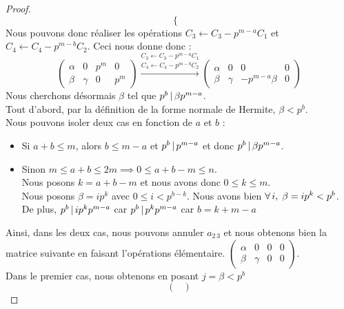 \documentclass[12pt]{article}
\begin{document}
\begin{proof}
$$\begin{cases*}
		\end{cases*}$$
	Nous pouvons donc réaliser les opérations $C_3 \leftarrow C_3 -p^{m-a}C_1$ et
	$C_4 \leftarrow C_4 -p^{m-b}C_2$. Ceci nous donne donc :
	\begin{equation*}
		\begin{pmatrix}
			\alpha & 0      & p^m & 0   \\
			\beta  & \gamma & 0   & p^m
		\end{pmatrix}
		\overset{C_3 \leftarrow C_3 -p^{m-a}C_1 }%
		{\overset{ C_4 \leftarrow C_4 -p^{m-b}C_2}{\longrightarrow}}
		\begin{pmatrix}
			\alpha & 0      & 0             & 0 \\
			\beta  & \gamma & -p^{m-a}\beta & 0
		\end{pmatrix}
	\end{equation*}
	Nous cherchons désormais $\beta$ tel que $p^b \, | \, \beta p^{m-a}$.\\
	Tout d'abord, par la définition de la forme normale de Hermite, $\beta< p^b$.\\
	Nous pouvons isoler deux cas en fonction de $a$ et $b$ :\\
	\begin{itemize}
		\item Si $a + b \le m$, alors $b \le m - a$ et $p^b \, | \, p^{m-a}$ et
		      donc $p^b \, | \, \beta p^{m-a}$.\\
		\item Sinon $m \le a + b \le 2m \implies 0 \le a + b -m \le n$.\\
		      Nous posons $k = a + b -m$ et nous avons donc $0 \le k \le m$.\\
		      Nous posons $\beta = ip^k$ avec $0 \le i < p^{b - k}$. Nous avons bien
		      $\forall \, i , \; \beta = ip^k < p^b$.\\
		      De plus, $p^b \, | \, ip^kp^{m-a}$ car  $p^b \, | \, p^kp^{m-a}$
		      car  $b = k + m - a$
	\end{itemize}
	Ainsi, dans les deux cas, nous pouvons annuler $a_{2\,3}$ et nous obtenons bien la matrice
	suivante en faisant l'opérations élémentaire.
	$\begin{pmatrix}
			\alpha & 0      & 0 & 0 \\
			\beta  & \gamma & 0 & 0
		\end{pmatrix}$.\\
	Dans le premier cas, nous obtenons en posant $j = \beta < p^b$
	\begin{equation*}
		\begin{pmatrix}

\end{pmatrix}
\end{equation*}
\end{proof}
\end{document}
